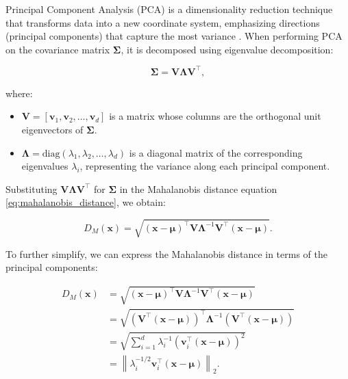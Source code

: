 Principal Component Analysis (PCA) is a dimensionality reduction technique that transforms data into a new coordinate system, emphasizing directions (principal components) that capture the most variance \citep{jolliffe2002principal}. When performing PCA on the covariance matrix $\boldsymbol{\Sigma}$, it is decomposed using eigenvalue decomposition:

\begin{equation}
    \label{eq:pca_decomposition}
    \boldsymbol{\Sigma} = \mathbf{V} \boldsymbol{\Lambda} \mathbf{V}^\top,
\end{equation}

where:
\begin{itemize}
    \item $\mathbf{V} = [\mathbf{v}_1, \mathbf{v}_2, \dots, \mathbf{v}_d]$ is a matrix whose columns are the orthogonal unit eigenvectors of $\boldsymbol{\Sigma}$.
    \item $\boldsymbol{\Lambda} = \text{diag}(\lambda_1, \lambda_2, \dots, \lambda_d)$ is a diagonal matrix of the corresponding eigenvalues $\lambda_i$, representing the variance along each principal component.
\end{itemize}

Substituting $\mathbf{V} \boldsymbol{\Lambda} \mathbf{V}^\top$ for $\boldsymbol{\Sigma}$ in the Mahalanobis distance equation \eqref{eq:mahalanobis_distance}, we obtain:

\begin{equation}
    \label{eq:mahalanobis_pca}
    D_M(\mathbf{x}) = \sqrt{ (\mathbf{x} - \boldsymbol{\mu})^\top \mathbf{V} \boldsymbol{\Lambda}^{-1} \mathbf{V}^\top (\mathbf{x} - \boldsymbol{\mu}) }.
\end{equation}

To further simplify, we can express the Mahalanobis distance in terms of the principal components:

\begin{align}
D_M(\mathbf{x}) &= \sqrt{ (\mathbf{x} - \boldsymbol{\mu})^\top \mathbf{V} \boldsymbol{\Lambda}^{-1} \mathbf{V}^\top (\mathbf{x} - \boldsymbol{\mu}) } \nonumber \\
&= \sqrt{ (\mathbf{V}^\top (\mathbf{x} - \boldsymbol{\mu}))^\top \boldsymbol{\Lambda}^{-1} (\mathbf{V}^\top (\mathbf{x} - \boldsymbol{\mu})) } \nonumber \\
&= \sqrt{ \sum_{i=1}^{d} \lambda_i^{-1} \left( \mathbf{v}_i^\top (\mathbf{x} - \boldsymbol{\mu}) \right)^2 } \nonumber \\
&= \left\| \lambda_i^{-1/2} \mathbf{v}_i^\top (\mathbf{x} - \boldsymbol{\mu}) \right\|_2.
\label{eq:mahalanobis_pca_l2}
\end{align}

